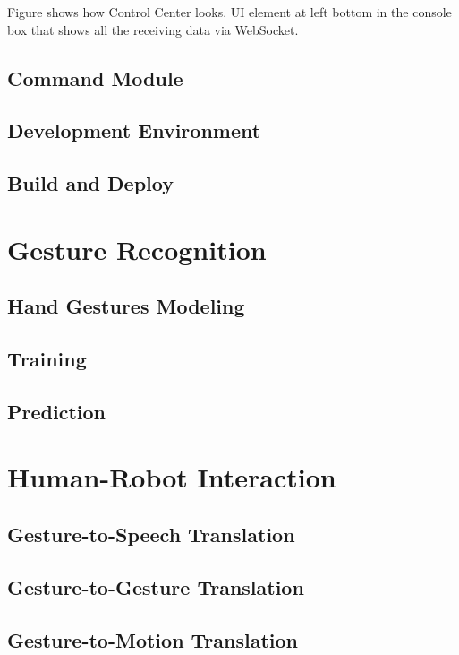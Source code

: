 Figure shows how Control Center looks. UI element at left bottom in the console box that shows all the receiving data via WebSocket. 

\subsection{Command Module} 

\subsection{Development Environment} 

\subsection{Build and Deploy}

\section{Gesture Recognition}

\subsection{Hand Gestures Modeling}

\subsection{Training}

\subsection{Prediction}

\section{Human-Robot Interaction}

\subsection{Gesture-to-Speech Translation}

\subsection{Gesture-to-Gesture Translation}

\subsection{Gesture-to-Motion Translation}


